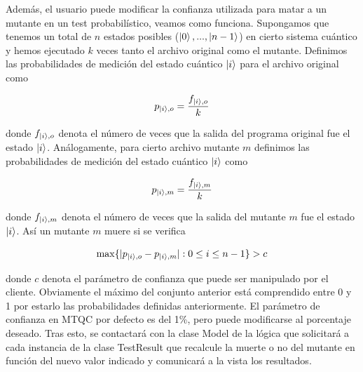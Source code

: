 Además, el usuario puede modificar la confianza utilizada para matar a un mutante en un test probabilístico, veamos como funciona. Supongamos que tenemos un total de $n$ estados posibles ($\left|0\right\rangle,...,\left|n-1\right\rangle$) en cierto sistema cuántico y hemos ejecutado $k$ veces tanto el archivo original como el mutante. Definimos las probabilidades de medición del estado cuántico $\left|i\right\rangle$ para el archivo original como

\begin{equation}
p_{\left|i\right\rangle,o}=\dfrac{f_{\left|i\right\rangle,o}}{k}
\end{equation}

donde $f_{\left|i\right\rangle,o}$ denota el número de veces que la salida del programa original fue el estado $\left|i\right\rangle$. Análogamente, para cierto archivo mutante $m$ definimos las probabilidades de medición del estado cuántico $\left|i\right\rangle$ como

\begin{equation}
p_{\left|i\right\rangle,m}=\dfrac{f_{\left|i\right\rangle,m}}{k}
\end{equation}

donde $f_{\left|i\right\rangle,m}$ denota el número de veces que la salida del mutante $m$ fue el estado $\left|i\right\rangle$. Así un mutante $m$ muere si se verifica

\begin{equation}
\max \{|p_{\left|i\right\rangle,o}-p_{\left|i\right\rangle,m}|:0\leq i\leq n - 1\}> c
\end{equation}

donde $c$ denota el parámetro de confianza que puede ser manipulado por el cliente. Obviamente el máximo del conjunto anterior está comprendido entre 0 y 1 por estarlo las probabilidades definidas anteriormente. El parámetro de confianza en MTQC por defecto es del 1\%, pero puede modificarse al porcentaje deseado. Tras esto, se contactará con la clase Model de la lógica que solicitará a cada instancia de la clase TestResult que recalcule la muerte o no del mutante en función del nuevo valor indicado y comunicará a la vista los resultados.
